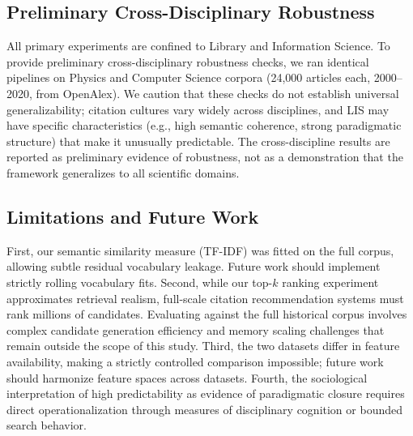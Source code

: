 \documentclass[11pt,a4paper]{article}
\begin{document}
\subsection{Preliminary Cross-Disciplinary Robustness}
All primary experiments are confined to Library and Information Science. To provide preliminary cross-disciplinary robustness checks, we ran identical pipelines on Physics and Computer Science corpora (24,000 articles each, 2000--2020, from OpenAlex). We caution that these checks do not establish universal generalizability; citation cultures vary widely across disciplines, and LIS may have specific characteristics (e.g., high semantic coherence, strong paradigmatic structure) that make it unusually predictable. The cross-discipline results are reported as preliminary evidence of robustness, not as a demonstration that the framework generalizes to all scientific domains.

\subsection{Limitations and Future Work}
First, our semantic similarity measure (TF-IDF) was fitted on the full corpus, allowing subtle residual vocabulary leakage. Future work should implement strictly rolling vocabulary fits. Second, while our top-$k$ ranking experiment approximates retrieval realism, full-scale citation recommendation systems must rank millions of candidates. Evaluating against the full historical corpus involves complex candidate generation efficiency and memory scaling challenges that remain outside the scope of this study. Third, the two datasets differ in feature availability, making a strictly controlled comparison impossible; future work should harmonize feature spaces across datasets. Fourth, the sociological interpretation of high predictability as evidence of paradigmatic closure requires direct operationalization through measures of disciplinary cognition or bounded search behavior.
\end{document}
